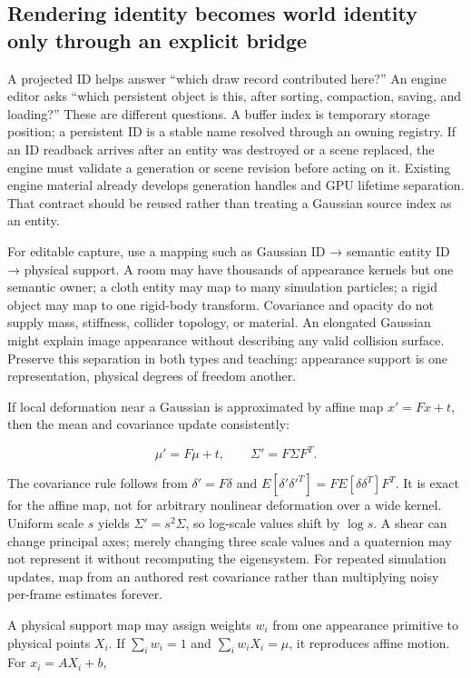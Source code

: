 \subsection{Rendering identity becomes world identity only through an explicit bridge}\label{rendering-identity-becomes-world-identity-only-through-an-explicit-bridge}

A projected ID helps answer ``which draw record contributed here?'' An engine editor asks ``which persistent object is this, after sorting, compaction, saving, and loading?'' These are different questions. A buffer index is temporary storage position; a persistent ID is a stable name resolved through an owning registry. If an ID readback arrives after an entity was destroyed or a scene replaced, the engine must validate a generation or scene revision before acting on it. Existing engine material already develops generation handles and GPU lifetime separation. That contract should be reused rather than treating a Gaussian source index as an entity.

For editable capture, use a mapping such as Gaussian ID → semantic entity ID → physical support. A room may have thousands of appearance kernels but one semantic owner; a cloth entity may map to many simulation particles; a rigid object may map to one rigid-body transform. Covariance and opacity do not supply mass, stiffness, collider topology, or material. An elongated Gaussian might explain image appearance without describing any valid collision surface. Preserve this separation in both types and teaching: appearance support is one representation, physical degrees of freedom another.

If local deformation near a Gaussian is approximated by affine map \(x'=Fx+t\), then the mean and covariance update consistently:

\[
\mu'=F\mu+t,\qquad \Sigma'=F\Sigma F^T.
\]

The covariance rule follows from \(\delta'=F\delta\) and \(E[\delta'\delta'^T]=FE[\delta\delta^T]F^T\). It is exact for the affine map, not for arbitrary nonlinear deformation over a wide kernel. Uniform scale \(s\) yields \(\Sigma'=s^2\Sigma\), so log-scale values shift by \(\log s\). A shear can change principal axes; merely changing three scale values and a quaternion may not represent it without recomputing the eigensystem. For repeated simulation updates, map from an authored rest covariance rather than multiplying noisy per-frame estimates forever.

A physical support map may assign weights \(w_i\) from one appearance primitive to physical points \(X_i\). If \(\sum_iw_i=1\) and \(\sum_iw_iX_i=\mu\), it reproduces affine motion. For \(x_i=AX_i+b\),

